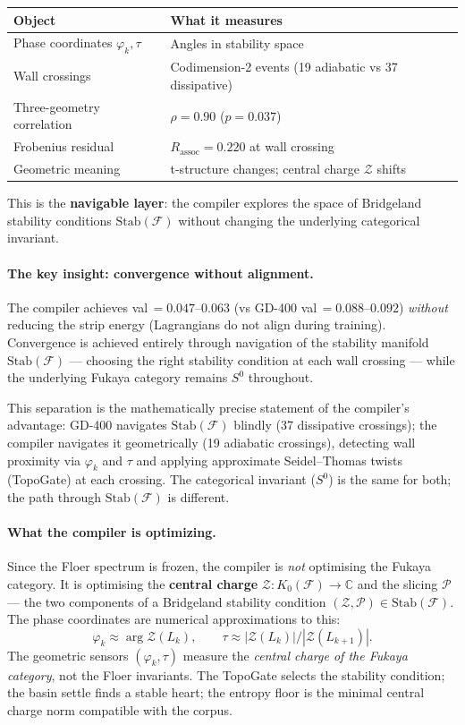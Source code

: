 \documentclass[11pt]{amsart}
\begin{document}
\begin{center}\small
\begin{tabular}{@{}ll@{}}
\toprule
Object & What it measures \\
\midrule
Phase coordinates $\varphi_k, \tau$ & Angles in stability space \\
Wall crossings & Codimension-2 events (19 adiabatic vs 37 dissipative) \\
Three-geometry correlation & $\rho = 0.90$ ($p = 0.037$) \\
Frobenius residual & $R_\mathrm{assoc} = 0.220$ at wall crossing \\
Geometric meaning & t-structure changes; central charge $\mathcal{Z}$ shifts \\
\bottomrule
\end{tabular}
\end{center}

This is the \textbf{navigable layer}: the compiler explores the space
of Bridgeland stability conditions $\mathrm{Stab}(\mathcal{F})$
without changing the underlying categorical invariant.

\paragraph{The key insight: convergence without alignment.}
The compiler achieves val\,$= 0.047$--$0.063$ (vs GD-400
val\,$= 0.088$--$0.092$) \emph{without} reducing the strip energy
(Lagrangians do not align during training).
Convergence is achieved entirely through navigation of the stability
manifold $\mathrm{Stab}(\mathcal{F})$ --- choosing the right
stability condition at each wall crossing --- while the underlying
Fukaya category remains $S^0$ throughout.

This separation is the mathematically precise statement of the
compiler's advantage:
GD-400 navigates $\mathrm{Stab}(\mathcal{F})$ blindly (37 dissipative
crossings); the compiler navigates it geometrically (19 adiabatic
crossings), detecting wall proximity via $\varphi_k$ and $\tau$
and applying approximate Seidel--Thomas twists (TopoGate) at each crossing.
The categorical invariant ($S^0$) is the same for both;
the path through $\mathrm{Stab}(\mathcal{F})$ is different.

\paragraph{What the compiler is optimizing.}
Since the Floer spectrum is frozen, the compiler is \emph{not} optimising
the Fukaya category.
It is optimising the \textbf{central charge}
$\mathcal{Z}: K_0(\mathcal{F}) \to \mathbb{C}$ and the slicing $\mathcal{P}$
--- the two components of a Bridgeland stability condition
$(\mathcal{Z}, \mathcal{P}) \in \mathrm{Stab}(\mathcal{F})$.
The phase coordinates are numerical approximations to this:
\[
  \varphi_k \approx \arg\mathcal{Z}(L_k), \qquad
  \tau \approx |\mathcal{Z}(L_k)|/|\mathcal{Z}(L_{k+1})|.
\]
The geometric sensors $(\varphi_k, \tau)$ measure the
\emph{central charge of the Fukaya category}, not the Floer invariants.
The TopoGate selects the stability condition; the basin settle finds a
stable heart; the entropy floor is the minimal central charge norm
compatible with the corpus.
\end{document}
